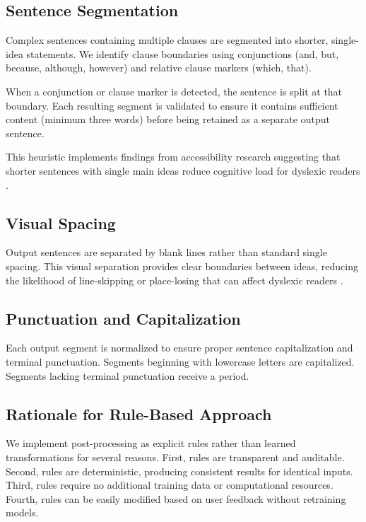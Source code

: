 \documentclass[11pt]{article}
\begin{document}
\subsection{Sentence Segmentation}

Complex sentences containing multiple clauses are segmented into shorter, single-idea statements. We identify clause boundaries using conjunctions (and, but, because, although, however) and relative clause markers (which, that).

When a conjunction or clause marker is detected, the sentence is split at that boundary. Each resulting segment is validated to ensure it contains sufficient content (minimum three words) before being retained as a separate output sentence.

This heuristic implements findings from accessibility research suggesting that shorter sentences with single main ideas reduce cognitive load for dyslexic readers \citep{siddharthan2014}.

\subsection{Visual Spacing}

Output sentences are separated by blank lines rather than standard single spacing. This visual separation provides clear boundaries between ideas, reducing the likelihood of line-skipping or place-losing that can affect dyslexic readers \citep{rello2013}.

\subsection{Punctuation and Capitalization}

Each output segment is normalized to ensure proper sentence capitalization and terminal punctuation. Segments beginning with lowercase letters are capitalized. Segments lacking terminal punctuation receive a period.

\subsection{Rationale for Rule-Based Approach}

We implement post-processing as explicit rules rather than learned transformations for several reasons. First, rules are transparent and auditable. Second, rules are deterministic, producing consistent results for identical inputs. Third, rules require no additional training data or computational resources. Fourth, rules can be easily modified based on user feedback without retraining models.
\end{document}
